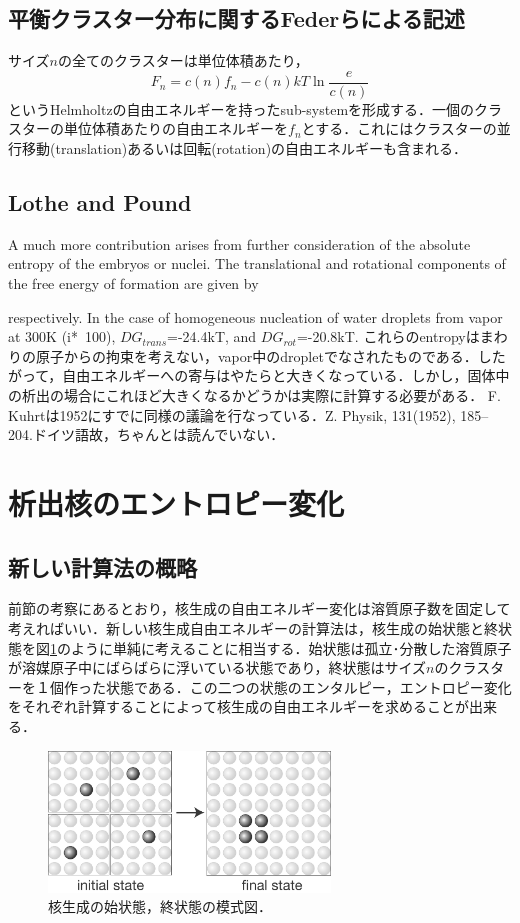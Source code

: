 \documentclass[a4j,10pt]{jarticle}
\begin{document}
\subsection{平衡クラスター分布に関するFederらによる記述\cite{Feder66}}
サイズ$n$の全てのクラスターは単位体積あたり，
\begin{equation}
F_n = c(n) f_n -c(n)kT \ln \frac{e}{c(n)}
\end{equation}
というHelmholtzの自由エネルギーを持ったsub-systemを形成する．一個のクラスターの単位体積あたりの自由エネルギーを$f_n$とする．これにはクラスターの並行移動(translation)あるいは回転(rotation)の自由エネルギーも含まれる．
\subsection{Lothe and Pound}
A much more contribution arises from further consideration of the absolute entropy of the embryos or nuclei.  The translational and rotational components of the free energy of formation are given by 

respectively.  In the case of homogeneous nucleation of water droplets from vapor at 300K (i*~100), $DG_{trans}$=-24.4kT, and $DG_{rot}$=-20.8kT.
これらのentropyはまわりの原子からの拘束を考えない，vapor中のdropletでなされたものである．したがって，自由エネルギーへの寄与はやたらと大きくなっている．しかし，固体中の析出の場合にこれほど大きくなるかどうかは実際に計算する必要がある．
F. Kuhrtは1952にすでに同様の議論を行なっている．Z. Physik, 131(1952), 185--204.ドイツ語故，ちゃんとは読んでいない．
\fi
\section{析出核のエントロピー変化}
\subsection{新しい計算法の概略}
前節の考察にあるとおり，核生成の自由エネルギー変化は溶質原子数を固定して考えればいい．新しい核生成自由エネルギーの計算法は，核生成の始状態と終状態を図\ref{directMethod}のように単純に考えることに相当する．始状態は孤立･分散した溶質原子が溶媒原子中にばらばらに浮いている状態であり，終状態はサイズ$n$のクラスターを１個作った状態である．この二つの状態のエンタルピー，エントロピー変化をそれぞれ計算することによって核生成の自由エネルギーを求めることが出来る．
\begin{figure}\begin{center}
\includegraphics[width=75mm]{./figs/Fig2.eps}
\caption{核生成の始状態，終状態の模式図．}
\label{directMethod}
\end{center}\end{figure}
\end{document}
